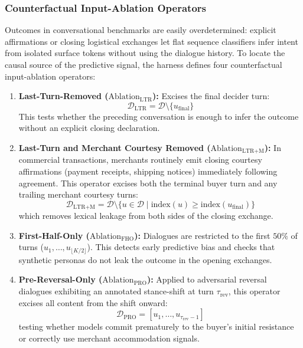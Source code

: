 \subsubsection{Counterfactual Input-Ablation Operators}
Outcomes in conversational benchmarks are easily overdetermined: explicit affirmations or closing logistical exchanges let flat sequence classifiers infer intent from isolated surface tokens without using the dialogue history. To locate the causal source of the predictive signal, the harness defines four counterfactual input-ablation operators:
\begin{enumerate}
  \item \textbf{Last-Turn-Removed ($\text{Ablation}_{\text{LTR}}$):} Excises the final decider turn:
    \begin{equation}
      \mathcal{D}_{\text{LTR}} = \mathcal{D} \setminus \{u_{\text{final}}\}
    \end{equation}
    This tests whether the preceding conversation is enough to infer the outcome without an explicit closing declaration.
  \item \textbf{Last-Turn and Merchant Courtesy Removed ($\text{Ablation}_{\text{LTR+M}}$):} In commercial transactions, merchants routinely emit closing courtesy affirmations (payment receipts, shipping notices) immediately following agreement. This operator excises both the terminal buyer turn and any trailing merchant courtesy turns:
    \begin{equation}
      \mathcal{D}_{\text{LTR+M}} = \mathcal{D} \setminus \{u \in \mathcal{D} \mid \text{index}(u) \ge \text{index}(u_{\text{final}})\}
    \end{equation}
    which removes lexical leakage from both sides of the closing exchange.
  \item \textbf{First-Half-Only ($\text{Ablation}_{\text{FHO}}$):} Dialogues are restricted to the first $50\%$ of turns ($u_1, \dots, u_{\lfloor K/2 \rfloor}$). This detects early predictive bias and checks that synthetic personas do not leak the outcome in the opening exchanges.
  \item \textbf{Pre-Reversal-Only ($\text{Ablation}_{\text{PRO}}$):} Applied to adversarial reversal dialogues exhibiting an annotated stance-shift at turn $\tau_{\text{rev}}$, this operator excises all content from the shift onward:
    \begin{equation}
      \mathcal{D}_{\text{PRO}} = [u_1, \dots, u_{\tau_{\text{rev}} - 1}]
    \end{equation}
    testing whether models commit prematurely to the buyer's initial resistance or correctly use merchant accommodation signals.
\end{enumerate}

